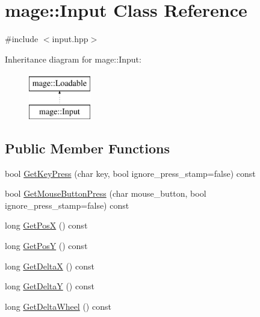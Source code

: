 \hypertarget{classmage_1_1_input}{}\section{mage\+:\+:Input Class Reference}
\label{classmage_1_1_input}


{\ttfamily \#include $<$input.\+hpp$>$}

Inheritance diagram for mage\+:\+:Input\+:\begin{figure}[H]
\begin{center}
\leavevmode
\includegraphics[height=2.000000cm]{classmage_1_1_input}
\end{center}
\end{figure}
\subsection*{Public Member Functions}
\begin{DoxyCompactItemize}
\item 
bool \hyperlink{classmage_1_1_input_af8a2cfde9c53f21c1d3cb88c6970480f}{Get\+Key\+Press} (char key, bool ignore\+\_\+press\+\_\+stamp=false) const
\item 
bool \hyperlink{classmage_1_1_input_ad035dee39b83fd49a85aa037b14b7f8a}{Get\+Mouse\+Button\+Press} (char mouse\+\_\+button, bool ignore\+\_\+press\+\_\+stamp=false) const
\item 
long \hyperlink{classmage_1_1_input_a5b839b6ead23e1c0ec623fb82c5d6e45}{Get\+PosX} () const
\item 
long \hyperlink{classmage_1_1_input_a4c7d46233ccf74d45c28549e5ecdd244}{Get\+PosY} () const
\item 
long \hyperlink{classmage_1_1_input_a6fcfe61fc9f5a2575375c7e2c39507f5}{Get\+DeltaX} () const
\item 
long \hyperlink{classmage_1_1_input_ac63b55db4438989d2c6729a358ace296}{Get\+DeltaY} () const
\item 
long \hyperlink{classmage_1_1_input_a59c042bc18b47bca3010eb4df7de44c2}{Get\+Delta\+Wheel} () const
\end{DoxyCompactItemize}
